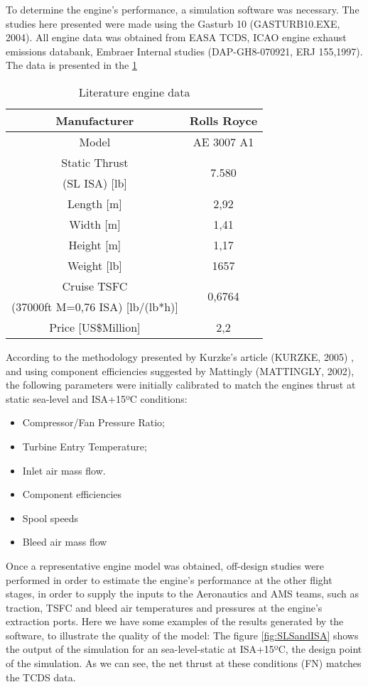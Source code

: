 ﻿To determine the engine's performance, a simulation software was necessary. The studies here presented were made using the Gasturb 10 (GASTURB10.EXE, 2004).
All engine data was obtained from EASA TCDS, ICAO engine exhaust emissions databank, Embraer Internal studies (DAP-GH8-070921, ERJ 155,1997).
The data is presented in the \ref{tab:enginedata}

\begin{table}[htbp]
  \centering
  \caption{Literature engine data}
    \begin{tabular}{cc}
    \toprule
    Manufacturer & Rolls Royce \\
    \midrule
    Model & AE 3007 A1 \\
    Static Thrust & \multirow{2}[2]{*}{7.580} \\
    (SL ISA) [lb] &  \\
    Length [m] & 2,92 \\
    Width [m] & 1,41 \\
    Height [m] & 1,17 \\
    Weight [lb] & 1657 \\
    Cruise TSFC & \multirow{2}[2]{*}{0,6764} \\
    (37000ft M=0,76 ISA)  [lb/(lb*h)] &  \\
    Price [US\$Million] & 2,2 \\
    \bottomrule
    \end{tabular}%
  \label{tab:enginedata}%
\end{table}%

According to the methodology presented by Kurzke's article (KURZKE, 2005) , and using component efficiencies suggested by Mattingly (MATTINGLY, 2002), the following parameters were initially calibrated to match the engines thrust at static sea-level and ISA+15ºC conditions:

\begin{itemize}
\item Compressor/Fan Pressure Ratio;
\item Turbine Entry Temperature;
\item Inlet air mass flow.
\item Component efficiencies
\item Spool speeds
\item Bleed air mass flow
\end{itemize}
Once a representative engine model was obtained, off-design studies were performed in order to estimate the engine's performance at the other flight stages, in order to supply the inputs to the Aeronautics and AMS teams, such as traction, TSFC and bleed air temperatures and pressures at the engine's extraction ports.
Here we have some examples of the results generated by the software, to illustrate the quality of the model:
The figure \ref{fig:SLSandISA} shows the output of the simulation for an sea-level-static at ISA+15ºC, the design point of the simulation. As we can see, the net thrust at these conditions (FN) matches the TCDS data.

